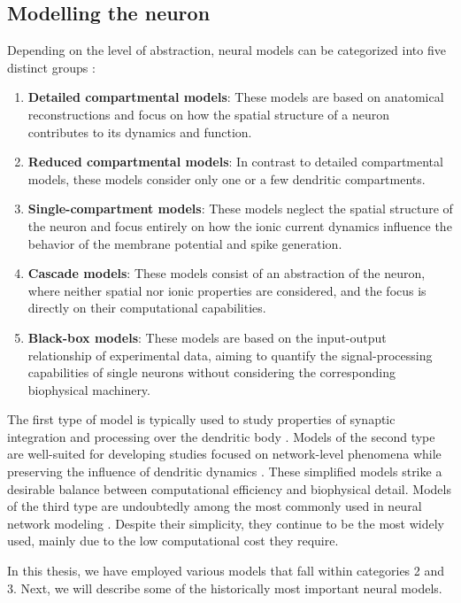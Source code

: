 \documentclass[../main.tex]{subfiles}
\begin{document}
\subsection{Modelling the neuron}
Depending on the level of abstraction, neural models can be categorized into five distinct groups \citep{herz_modeling_2006}:
\begin{enumerate}
    \item \textbf{Detailed compartmental models}: These models are based on anatomical reconstructions and focus on how the spatial structure of a neuron contributes to its dynamics and function.
    \item \textbf{Reduced compartmental models}: In contrast to detailed compartmental models, these models consider only one or a few dendritic compartments.
    \item \textbf{Single-compartment models}: These models neglect the spatial structure of the neuron and focus entirely on how the ionic current dynamics influence the behavior of the membrane potential and spike generation.
    \item \textbf{Cascade models}: These models consist of an abstraction of the neuron, where neither spatial nor ionic properties are considered, and the focus is directly on their computational capabilities.
    \item \textbf{Black-box models}: These models are based on the input-output relationship of experimental data, aiming to quantify the signal-processing capabilities of single neurons without considering the corresponding biophysical machinery.
\end{enumerate}
The first type of model is typically used to study properties of synaptic integration and processing over the dendritic body \citep{poirazi_arithmetic_2003,cutsuridis_computational_2015,tzilivaki_challenging_2019}.
Models of the second type are well-suited for developing studies focused on network-level phenomena while preserving the influence of dendritic dynamics \citep{tort_dynamic_2008,stacey_synaptic_2009,neymotin_ketamine_2011,Udakis2020}.
These simplified models strike a desirable balance between computational efficiency and biophysical detail.
Models of the third type are undoubtedly among the most commonly used in neural network modeling \citep{nakagawa_how_2014,palmigiano_flexible_2017-1,pariz_high_2018}.
Despite their simplicity, they continue to be the most widely used, mainly due to the low computational cost they require.

In this thesis, we have employed various models that fall within categories 2 and 3. Next, we will describe some of the historically most important neural models.
\end{document}
